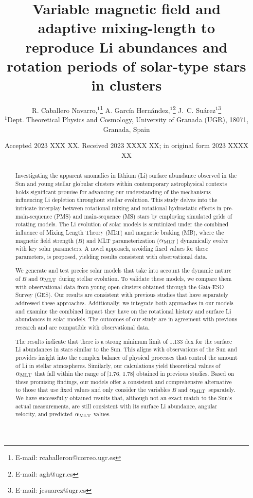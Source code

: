 \documentclass[fleqn,usenatbib]{mnras}
\title[Rotation, magnetic braking \& Li abundances]{Variable magnetic field and adaptive mixing-length to reproduce Li abundances and rotation periods of solar-type stars in clusters}
\author[R. Caballero Navarro et al.]{
R. Caballero Navarro,$^{1}$\thanks{E-mail: rcaballeron@correo.ugr.es}
A. Garc\'ia Hern\'andez,$^{1}$\thanks{E-mail: agh@ugr.es}
J.~C. Su\'arez$^{1}$\thanks{E-mail: jcsuarez@ugr.es}
\\
$^{1}$Dept. Theoretical Physics and Cosmology, University of Granada (UGR), 18071, Granada, Spain\\
}
\date{Accepted 2023 XXX XX. Received 2023 XXXX XX; in original form 2023 XXXX XX}
\begin{document}
\label{firstpage}
\pagerange{\pageref{firstpage}--\pageref{lastpage}}
\maketitle

\begin{abstract}
Investigating the apparent anomalies in lithium (Li) surface abundance observed in the Sun and young stellar globular clusters within contemporary astrophysical contexts holds significant promise for advancing our understanding of the mechanisms influencing Li depletion throughout stellar evolution. This study delves into the intricate interplay between rotational mixing and rotational hydrostatic effects in pre-main-sequence (PMS) and main-sequence (MS) stars by employing simulated grids of rotating models. The Li evolution of solar models is scrutinized under the combined influence of Mixing Length Theory (MLT) and magnetic braking (MB), where the magnetic field strength ($B$) and MLT parameterization ($\alpha_{\mathrm{MLT}}$) dynamically evolve with key solar parameters. A novel approach, avoiding fixed values for these parameters, is proposed, yielding results consistent with observational data.\par

We generate and test precise solar models that take into account the dynamic nature of $B$ and $\alpha_{\mathrm{MLT}}$ during stellar evolution. To validate these models, we compare them with observational data from young open clusters obtained through the Gaia-ESO Survey (GES). Our results are consistent with previous studies that have separately addressed these approaches. Additionally, we integrate both approaches in our models and examine the combined impact they have on the rotational history and surface Li abundances in solar models. The outcomes of our study are in agreement with previous research and are compatible with observational data.\par

The results indicate that there is a strong minimum limit of 1.133 dex for the surface Li abundances in stars similar to the Sun. This aligns with observations of the Sun and provides insight into the complex balance of physical processes that control the amount of Li in stellar atmospheres. Similarly, our calculations yield theoretical values of $\alpha_{\mathrm{MLT}}$ that fall within the range of [1.76, 1.78] obtained in previous studies. Based on these promising findings, our models offer a consistent and comprehensive alternative to those that use fixed values and only consider the variables $B$ and $\alpha_{\mathrm{MLT}}$ separately. We have successfully obtained results that, although not an exact match to the Sun's actual measurements, are still consistent with its surface Li abundance, angular velocity, and predicted $\alpha_{\mathrm{MLT}}$ values.

\end{abstract}
\end{document}
